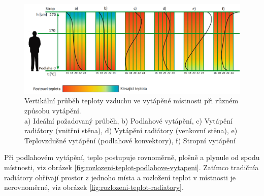 \begin{figure}[h]
  \includegraphics[width=\linewidth]{images/vertikalni-prubehy-teplot-pro-ruzne-druhy-vytapeni.png}
  \caption{Vertikální průběh teploty vzduchu ve vytápěné místnosti při různém způsobu vytápění. \cite{vertikalni-prubehy-teplot-pro-ruzne-druhy-vytapeni} \\ a) Ideální požadovaný průběh, b) Podlahové vytápění, c) Vytápění radiátory (vnitřní stěna), d) Vytápění radiátory (venkovní stěna), e) Teplovzdušné vytápění (podlahové konvektory), f) Stropní vytápění }
  \label{fig:vertikalni-prubehy-teplot-pro-ruzne-druhy-vytapeni}
\end{figure}

Při podlahovém vytápění, teplo postupuje rovnoměrně, plošně a plynule od spodu místnosti, viz obrázek \ref{fig:rozlozeni-teplot-podlahove-vytapeni}. Zatímco tradičnía radiátory ohřívají prostor z jednoho místa a rozložení teplot v místnosti je nerovnoměrné, viz obrázek \ref{fig:rozlozeni-teplot-radiatory}.

